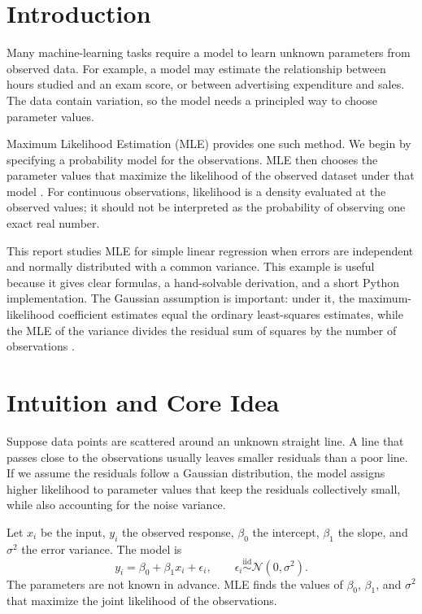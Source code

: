 \documentclass[11pt,a4paper]{article}
\begin{document}
\tableofcontents
\clearpage
{}

\section{Introduction}
Many machine-learning tasks require a model to learn unknown parameters from observed data. For example, a model may estimate the relationship between hours studied and an exam score, or between advertising expenditure and sales. The data contain variation, so the model needs a principled way to choose parameter values.

Maximum Likelihood Estimation (MLE) provides one such method. We begin by specifying a probability model for the observations. MLE then chooses the parameter values that maximize the likelihood of the observed dataset under that model \cite{casella,murphy}. For continuous observations, likelihood is a density evaluated at the observed values; it should not be interpreted as the probability of observing one exact real number.

This report studies MLE for simple linear regression when errors are independent and normally distributed with a common variance. This example is useful because it gives clear formulas, a hand-solvable derivation, and a short Python implementation. The Gaussian assumption is important: under it, the maximum-likelihood coefficient estimates equal the ordinary least-squares estimates, while the MLE of the variance divides the residual sum of squares by the number of observations \cite{bishop,murphy}.

\section{Intuition and Core Idea}
Suppose data points are scattered around an unknown straight line. A line that passes close to the observations usually leaves smaller residuals than a poor line. If we assume the residuals follow a Gaussian distribution, the model assigns higher likelihood to parameter values that keep the residuals collectively small, while also accounting for the noise variance.

Let $x_i$ be the input, $y_i$ the observed response, $\beta_0$ the intercept, $\beta_1$ the slope, and $\sigma^2$ the error variance. The model is
\[
y_i=\beta_0+\beta_1x_i+\epsilon_i,\qquad
\epsilon_i\overset{\mathrm{iid}}{\sim}\mathcal{N}(0,\sigma^2).
\]
The parameters are not known in advance. MLE finds the values of $\beta_0$, $\beta_1$, and $\sigma^2$ that maximize the joint likelihood of the observations.
\end{document}
